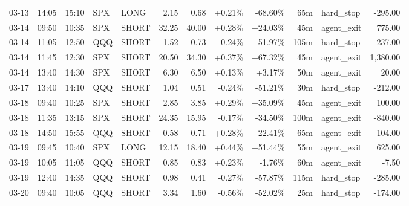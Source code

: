 \documentclass[11pt,a4paper,twoside]{article}
\begin{document}
\begin{center}
\begin{longtable}{>{\color{txtmain}}l l l l l r r r r r >{\color{txtmain}}l r}
03-13 & 14:05 & 15:10 & SPX & LONG & 2.15 & 0.68 & \textcolor{wingreen}{+0.21\%} & \textcolor{lossred}{-68.60\%} & 65m & hard\_stop & \textcolor{lossred}{-295.00} \\
03-14 & 09:50 & 10:35 & SPX & SHORT & 32.25 & 40.00 & \textcolor{wingreen}{+0.28\%} & \textcolor{wingreen}{+24.03\%} & 45m & agent\_exit & \textcolor{wingreen}{775.00} \\
03-14 & 11:05 & 12:50 & QQQ & SHORT & 1.52 & 0.73 & \textcolor{lossred}{-0.24\%} & \textcolor{lossred}{-51.97\%} & 105m & hard\_stop & \textcolor{lossred}{-237.00} \\
03-14 & 11:45 & 12:30 & SPX & SHORT & 20.50 & 34.30 & \textcolor{wingreen}{+0.37\%} & \textcolor{wingreen}{+67.32\%} & 45m & agent\_exit & \textcolor{wingreen}{1,380.00} \\
03-14 & 13:40 & 14:30 & SPX & SHORT & 6.30 & 6.50 & \textcolor{wingreen}{+0.13\%} & \textcolor{wingreen}{+3.17\%} & 50m & agent\_exit & \textcolor{wingreen}{20.00} \\
03-17 & 13:40 & 14:10 & QQQ & SHORT & 1.04 & 0.51 & \textcolor{lossred}{-0.24\%} & \textcolor{lossred}{-51.21\%} & 30m & hard\_stop & \textcolor{lossred}{-212.00} \\
03-18 & 09:40 & 10:25 & SPX & SHORT & 2.85 & 3.85 & \textcolor{wingreen}{+0.29\%} & \textcolor{wingreen}{+35.09\%} & 45m & agent\_exit & \textcolor{wingreen}{100.00} \\
03-18 & 11:35 & 13:15 & SPX & SHORT & 24.35 & 15.95 & \textcolor{lossred}{-0.17\%} & \textcolor{lossred}{-34.50\%} & 100m & agent\_exit & \textcolor{lossred}{-840.00} \\
03-18 & 14:50 & 15:55 & QQQ & SHORT & 0.58 & 0.71 & \textcolor{wingreen}{+0.28\%} & \textcolor{wingreen}{+22.41\%} & 65m & agent\_exit & \textcolor{wingreen}{104.00} \\
03-19 & 09:45 & 10:40 & SPX & LONG & 12.15 & 18.40 & \textcolor{wingreen}{+0.44\%} & \textcolor{wingreen}{+51.44\%} & 55m & agent\_exit & \textcolor{wingreen}{625.00} \\
03-19 & 10:05 & 11:05 & QQQ & SHORT & 0.85 & 0.83 & \textcolor{wingreen}{+0.23\%} & \textcolor{lossred}{-1.76\%} & 60m & agent\_exit & \textcolor{lossred}{-7.50} \\
03-19 & 12:40 & 14:35 & QQQ & SHORT & 0.98 & 0.41 & \textcolor{lossred}{-0.27\%} & \textcolor{lossred}{-57.87\%} & 115m & hard\_stop & \textcolor{lossred}{-285.00} \\
03-20 & 09:40 & 10:05 & QQQ & SHORT & 3.34 & 1.60 & \textcolor{lossred}{-0.56\%} & \textcolor{lossred}{-52.02\%} & 25m & hard\_stop & \textcolor{lossred}{-174.00} \\

\end{longtable}
\end{center}
\end{document}
